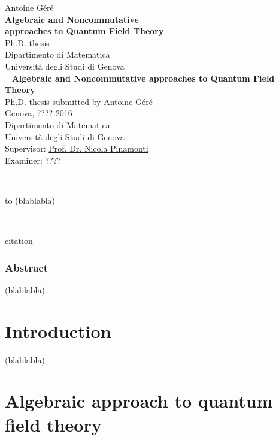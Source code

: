 \documentclass[10pt]{book}
\makeatletter
\newcommand*{\makepagetitle}{%
%
\thispagestyle{empty}
%
{{\raggedright%
%
\vspace*{44pt}%
%
{\LARGE Antoine Géré}\\[\baselineskip]%
%
\vspace*{100pt}%
%
{\Huge\bfseries Algebraic and Noncommutative \\[8pt] approaches to Quantum Field Theory}\\[\baselineskip]%
%
\vspace*{22pt}%
%
{\LARGE Ph.D. thesis}\\[\baselineskip]%
%
\vspace*{44pt}%
%
{\LARGE Dipartimento di Matematica}\\[\baselineskip]%
%
{\LARGE Università degli Studi di Genova}\\[\baselineskip]%
%
\vfill%
%
\newpage%
%
\thispagestyle{empty}%
%
\ \vfill%
%
\textbf{Algebraic and Noncommutative approaches to Quantum Field Theory} \\
Ph.D. thesis submitted by \href{mailto:gere@dima.unige.it}{Antoine Géré} \\
Genova, ???? 2016 \\[8pt]
%
Dipartimento di Matematica \\
Università degli Studi di Genova \\[8pt]
%
Supervisor: \href{mailto:pinamont@dima.unige.it}{Prof. Dr. Nicola Pinamonti} \\
Examiner: ????
%
}}%
%
}%
\theoremstyle{break}
\makeatother
\begin{document}


\makepagetitle

\newpage


\ \vfill

\begin{flushright}
to (blablabla) 
\end{flushright}

\vfill


\newpage

\ \vfill

\begin{flushright}
citation
\end{flushright}

\vfill


\newpage

\vspace*{100pt}

\thispagestyle{empty}

\section*{Abstract}

(blablabla)


\tableofcontents


\part*{Introduction}


(blablabla)

\part{Algebraic approach to quantum field theory}
\end{document}
